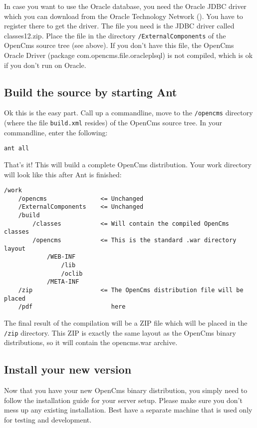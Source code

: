 In case you want to use the Oracle database, you need the Oracle JDBC driver
which you can download from the Oracle Technology Network 
(). You have to register 
there to get the driver. The file 
you need is the JDBC driver called classes12.zip. Place the file in the 
directory \texttt{/ExternalComponents} of the OpenCms source tree (see above). If you 
don't have this file, the OpenCms Oracle Driver 
(package com.opencms.file.oracleplsql) is not compiled, which is ok if you 
don't run on Oracle.

\subsection{Build the source by starting Ant}

Ok this is the easy part. Call up a commandline, move to the \texttt{/opencms} 
directory (where the file \texttt{build.xml} resides) of the OpenCms source tree. 
In your commandline, enter the following: 

\texttt{ant all} 

That's it! This will build a complete OpenCms distribution. Your work 
directory will look like this after Ant is finished: 

\begin{verbatim}
/work
    /opencms               <= Unchanged
    /ExternalComponents    <= Unchanged
    /build
        /classes           <= Will contain the compiled OpenCms classes
        /opencms           <= This is the standard .war directory layout
            /WEB-INF
                /lib
                /oclib
            /META-INF
    /zip                   <= The OpenCms distribution file will be placed
    /pdf                      here
\end{verbatim}


The final result of the compilation will be a ZIP file which will be placed 
in the \texttt{/zip} directory. This ZIP is exactly the same layout as the OpenCms
binary distributions, so it will contain the opencms.war archive. 

\subsection{Install your new version}

Now that you have your new OpenCms binary distribution, you simply need to 
follow the installation guide for your server setup. Please make sure you 
don't mess up any existing installation. Best have a separate machine that 
is used only for testing and development. 

